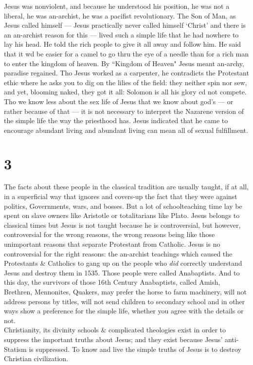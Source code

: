 \documentclass[12pt, onecolumn, letterpaper, oneside]{book}
\begin{document}
Jesus was nonviolent, and because he understood his position, he was not a liberal, he was an-archist, he was a pacifist revolutionary. The Son of Man, as Jesus called himself --- Jesus practically never called himself `Christ' and there is an an-archist reason for this --- lived such a simple life that he had nowhere to lay his head. He told the rich people to give it all away and follow him. He said that it wd be easier for a camel to go thru the eye of a needle than for a rich man to enter the kingdom of heaven. By ``Kingdom of Heaven" Jesus meant an-archy, paradise regained. Tho Jesus worked as a carpenter, he contradicts the Protestant ethic where he asks you to dig on the lilies of the field: they neither spin nor sew, and yet, blooming naked, they got it all: Solomon is all his glory cd not compete. Tho we know less about the sex life of Jesus that we know about god's --- or rather because of that --- it is not necessary to interpret the Nazarene version of the simple life the way the priesthood has. Jesus indicated that he came to encourage abundant living and abundant living can mean all of sexual fulfillment.

\section*{3}
The facts about these people in the classical tradition are usually taught, if at all, in a superficial way that ignores and covers-up the fact that they were against politics, Governments, wars, and bosses. But a lot of schoolteaching time lay be spent on slave owners like Aristotle or totalitarians like Plato. Jesus belongs to classical times but Jesus is not taught because he is controversial, but however, controversial for the wrong reasons, the wrong reasons being like those unimportant reasons that separate Protestant from Catholic. Jesus is no controversial for the right reasons: the an-archist teachings which caused the Protestants \& Catholics to gang up on the people who \emph{did} correctly understand Jesus and destroy them in 1535. Those people were called Anabaptists. And to this day, the survivors of those 16th Century Anabaptists, called Amish, Brethren, Mennonites, Quakers, may prefer the horse to farm machinery, will not address persons by titles, will not send children to secondary school and in other ways show a preference for the simple life, whether you agree with the details or not.\\
Christianity, its divinity schools \& complicated theologies exist in order to suppress the important truths about Jesus; and they exist because Jesus' anti-Statism is suppressed. To know and live the simple truths of Jesus is to destroy Christian civilization.
\end{document}
